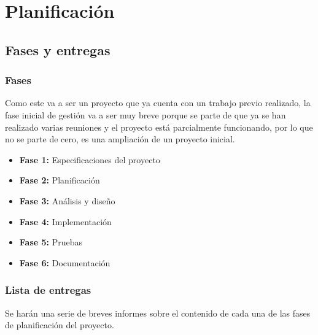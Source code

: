 \chapter{Planificación}

\section{Fases y entregas}

\subsection{Fases}

Como este va a ser un proyecto que ya cuenta con un trabajo previo realizado, la fase inicial de gestión va a ser muy breve
porque se parte de que ya se han realizado varias reuniones y el proyecto está parcialmente funcionando, por lo que no se parte
de cero, es una ampliación de un proyecto inicial.

\begin{itemize}
  \item \textbf{Fase 1:} Especificaciones del proyecto
  \item \textbf{Fase 2:} Planificación
  \item \textbf{Fase 3:} Análisis y diseño
  \item \textbf{Fase 4:} Implementación
  \item \textbf{Fase 5:} Pruebas
  \item \textbf{Fase 6:} Documentación
\end{itemize}

\subsection{Lista de entregas}

Se harán una serie de breves informes sobre el contenido de cada una de las fases de planificación del proyecto.

